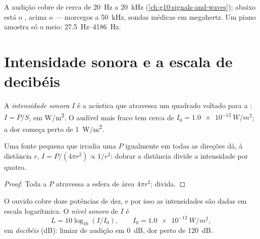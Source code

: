 \begin{remark}\label{rem:g12:sound-acoustics:audible}
A audição cobre de cerca de \qty{20}{Hz} a \qty{20}{kHz}
(\cref{ch:g10:signals-and-waves}); abaixo está o , acima o
 --- morcegos a \qty{50}{kHz}, sondas médicas em megahertz. Um
piano amostra só o meio: \qtyrange{27.5}{4186}{Hz}.
\end{remark}

\section{Intensidade sonora e a escala de decibéis}

\begin{definition}\label{def:g12:sound-acoustics:intensity}
A \emph{intensidade sonora} $I$ é a 
acústica que atravessa um  quadrado voltado para a : $I = P/S$,
em \unit{W/m^2}. O  audível mais fraco tem cerca de
$I_0 = \qty{1.0e-12}{W/m^2}$; a dor começa perto de \qty{1}{W/m^2}.
\end{definition}

\begin{proposition}\label{prop:g12:sound-acoustics:inverse-square}
%
Uma fonte pequena que irradia uma  $P$ igualmente em todas as
direções dá, à distância $r$, $I = P/(4\pi r^2) \propto 1/r^2$: dobrar a
distância divide a intensidade por quatro.
\end{proposition}

\begin{proof}
Toda a  $P$ atravessa a esfera de área $4\pi r^2$; divida.
\end{proof}

\begin{definition}\label{def:g12:sound-acoustics:level}
O ouvido cobre doze potências de dez, e por isso as intensidades são
dadas em escala logarítmica. O \emph{nível sonoro} de
$I$ é
\[ L = 10 \log_{10}(I/I_0), \qquad I_0 = \qty{1.0e-12}{W/m^2}, \]
em \emph{decibéis} (\unit{dB}): limiar de audição em
\qty{0}{dB}, dor perto de \qty{120}{dB}.
\end{definition}

